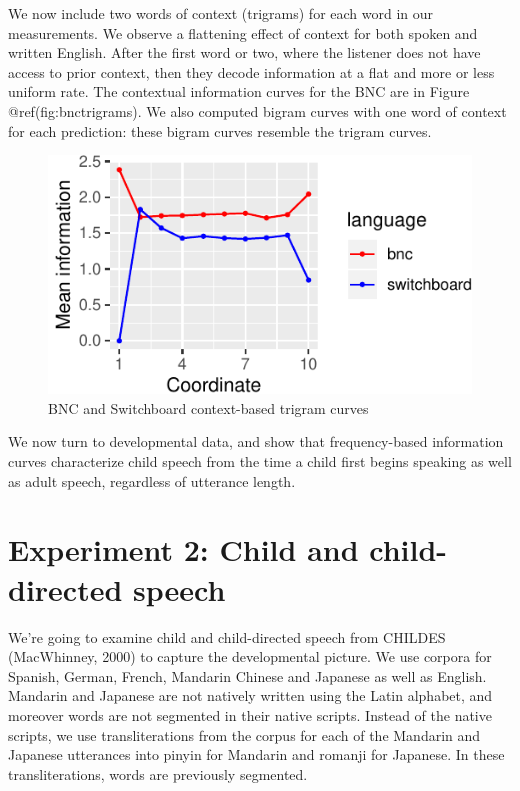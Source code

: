 \documentclass[10pt, letterpaper]{article}
\newenvironment{CodeChunk}{}{}
\begin{document}
We now include two words of context (trigrams) for each word in our
measurements. We observe a flattening effect of context for both spoken
and written English. After the first word or two, where the listener
does not have access to prior context, then they decode information at a
flat and more or less uniform rate. The contextual information curves
for the BNC are in Figure @ref(fig:bnctrigrams). We also computed bigram
curves with one word of context for each prediction: these bigram curves
resemble the trigram curves.

\begin{CodeChunk}
\begin{figure}[tb]
\includegraphics{figs/bnctrigrams-1} \caption[BNC and Switchboard context-based trigram curves]{BNC and Switchboard context-based trigram curves}\label{fig:bnctrigrams}
\end{figure}
\end{CodeChunk}

We now turn to developmental data, and show that frequency-based
information curves characterize child speech from the time a child first
begins speaking as well as adult speech, regardless of utterance length.

\hypertarget{experiment-2-child-and-child-directed-speech}{%
\section{Experiment 2: Child and child-directed
speech}\label{experiment-2-child-and-child-directed-speech}}

We're going to examine child and child-directed speech from CHILDES
(MacWhinney, 2000) to capture the developmental picture. We use corpora
for Spanish, German, French, Mandarin Chinese and Japanese as well as
English. Mandarin and Japanese are not natively written using the Latin
alphabet, and moreover words are not segmented in their native scripts.
Instead of the native scripts, we use transliterations from the corpus
for each of the Mandarin and Japanese utterances into pinyin for
Mandarin and romanji for Japanese. In these transliterations, words are
previously segmented.
\end{document}
